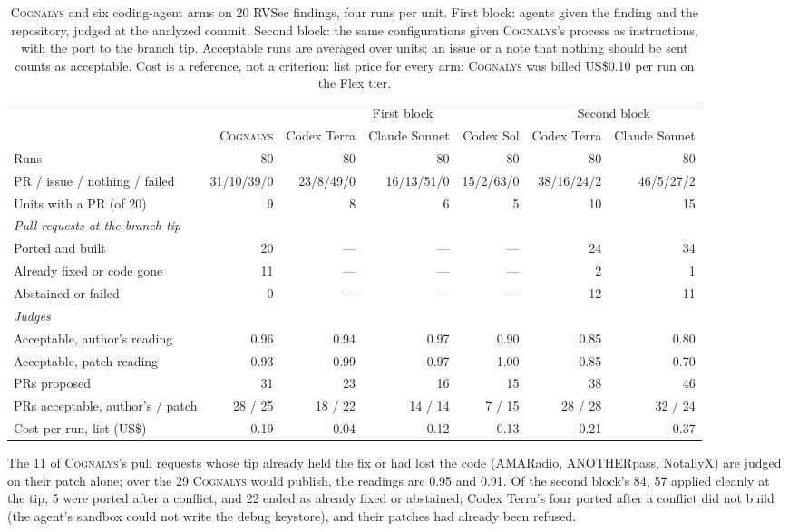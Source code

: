 \documentclass[conference]{IEEEtran}
\newcommand{\system}{\textsc{Cognalys}}
\begin{document}
\begin{table}[t]
\centering
\caption{\system{} and six coding-agent arms on 20 RVSec findings, four runs
per unit. First block: agents given the finding and the repository, judged at
the analyzed commit. Second block: the same configurations given \system{}'s
process as instructions, with the port to the branch tip. Acceptable runs are
averaged over units; an issue or a note that nothing should be sent counts as
acceptable. Cost is a reference, not a criterion: list price for every arm;
\system{} was billed US\$0.10
per run on the Flex tier.}
\label{tab:optiona}
\footnotesize
\setlength{\tabcolsep}{4pt}
\begin{tabular}{p{4.2cm}r|rrr|rr}
\toprule
 & & \multicolumn{3}{c|}{First block} & \multicolumn{2}{c}{Second block} \\
 & \system{} & Codex Terra & Claude Sonnet & Codex Sol & Codex Terra & Claude Sonnet \\
\midrule
Runs & 80 & 80 & 80 & 80 & 80 & 80 \\
PR / issue / nothing / failed & 31/10/39/0 & 23/8/49/0 & 16/13/51/0 & 15/2/63/0 & 38/16/24/2 & 46/5/27/2 \\
Units with a PR (of 20) & 9 & 8 & 6 & 5 & 10 & 15 \\
\multicolumn{7}{l}{\emph{Pull requests at the branch tip}} \\
\quad Ported and built & 20 & --- & --- & --- & 24 & 34 \\
\quad Already fixed or code gone & 11 & --- & --- & --- & 2 & 1 \\
\quad Abstained or failed & 0 & --- & --- & --- & 12 & 11 \\
\multicolumn{7}{l}{\emph{Judges}} \\
\quad Acceptable, author's reading & 0.96 & 0.94 & 0.97 & 0.90 & 0.85 & 0.80 \\
\quad Acceptable, patch reading & 0.93 & 0.99 & 0.97 & 1.00 & 0.85 & 0.70 \\
\quad PRs proposed & 31 & 23 & 16 & 15 & 38 & 46 \\
\quad PRs acceptable, author's / patch & 28 / 25 & 18 / 22 & 14 / 14 & 7 / 15 & 28 / 28 & 32 / 24 \\
Cost per run, list (US\$) & 0.19 & 0.04 & 0.12 & 0.13 & 0.21 & 0.37 \\
\bottomrule
\end{tabular}
\end{table}

The 11 of \system{}'s pull requests whose tip already held the fix or had lost
the code (AMARadio, ANOTHERpass, NotallyX) are judged on their patch alone;
over the 29 \system{} would publish, the readings are 0.95 and 0.91. Of the
second block's 84, 57 applied cleanly at the tip, 5 were ported after a
conflict, and 22 ended as already fixed or abstained; Codex Terra's four ported
after a conflict did not build (the agent's sandbox could not write the debug
keystore), and their patches had already been refused.
\end{document}

